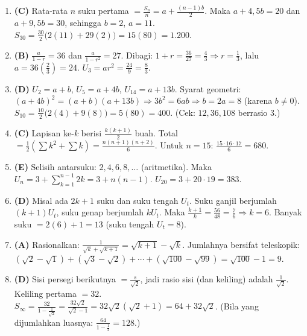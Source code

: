 \documentclass[a4paper,11pt]{article}
\newcommand{\dis}{\displaystyle}
\newcounter{no}
\begin{document}
\begin{enumerate}[leftmargin=2em,itemsep=2pt,topsep=2pt]
\item[\textbf{13.}] \textbf{(C)} Rata-rata $n$ suku pertama $=\dis\frac{S_n}{n}=a+\dis\frac{(n-1)b}{2}$. Maka $a+4{,}5b=20$ dan $a+9{,}5b=30$, sehingga $b=2$, $a=11$. $S_{30}=\dis\frac{30}{2}\big(2(11)+29(2)\big)=15(80)=1.200$.
\item[\textbf{14.}] \textbf{(B)} $\dis\frac{a}{1-r}=36$ dan $\dis\frac{a}{1-r^{2}}=27$. Dibagi: $1+r=\dis\frac{36}{27}=\dis\frac43\Rightarrow r=\dis\frac13$, lalu $a=36\left(\dis\frac23\right)=24$. $U_3=ar^{2}=\dis\frac{24}{9}=\dis\frac83$.
\item[\textbf{15.}] \textbf{(D)} $U_2=a+b$, $U_5=a+4b$, $U_{14}=a+13b$. Syarat geometri: $(a+4b)^{2}=(a+b)(a+13b)\Rightarrow3b^{2}=6ab\Rightarrow b=2a=8$ (karena $b\neq0$). $S_{10}=\dis\frac{10}{2}\big(2(4)+9(8)\big)=5(80)=400$. (Cek: $12,36,108$ berrasio $3$.)
\item[\textbf{16.}] \textbf{(C)} Lapisan ke-$k$ berisi $\dis\frac{k(k+1)}{2}$ buah. Total $=\dis\frac12\left(\sum k^{2}+\sum k\right)=\dis\frac{n(n+1)(n+2)}{6}$. Untuk $n=15$: $\dis\frac{15\cdot16\cdot17}{6}=680$.
\item[\textbf{17.}] \textbf{(E)} Selisih antarsuku: $2,4,6,8,\ldots$ (aritmetika). Maka $U_n=3+\sum_{k=1}^{n-1}2k=3+n(n-1)$. $U_{20}=3+20\cdot19=383$.
\item[\textbf{18.}] \textbf{(D)} Misal ada $2k+1$ suku dan suku tengah $U_t$. Suku ganjil berjumlah $(k+1)U_t$, suku genap berjumlah $kU_t$. Maka $\dis\frac{k+1}{k}=\dis\frac{56}{48}=\dis\frac76\Rightarrow k=6$. Banyak suku $=2(6)+1=13$ (suku tengah $U_t=8$).
\item[\textbf{19.}] \textbf{(A)} Rasionalkan: $\dis\frac{1}{\sqrt k+\sqrt{k+1}}=\sqrt{k+1}-\sqrt{k}$. Jumlahnya bersifat teleskopik: $(\sqrt2-\sqrt1)+(\sqrt3-\sqrt2)+\cdots+(\sqrt{100}-\sqrt{99})=\sqrt{100}-1=9$.
\item[\textbf{20.}] \textbf{(D)} Sisi persegi berikutnya $=\dis\frac{s}{\sqrt2}$, jadi rasio sisi (dan keliling) adalah $\dis\frac{1}{\sqrt2}$. Keliling pertama $=32$. $S_\infty=\dis\frac{32}{1-\frac1{\sqrt2}}=\dis\frac{32\sqrt2}{\sqrt2-1}=32\sqrt2(\sqrt2+1)=64+32\sqrt2$. (Bila yang dijumlahkan luasnya: $\dis\frac{64}{1-\frac12}=128$.)
\end{enumerate}
\par{}\par\vspace{0.2em}
\end{document}
